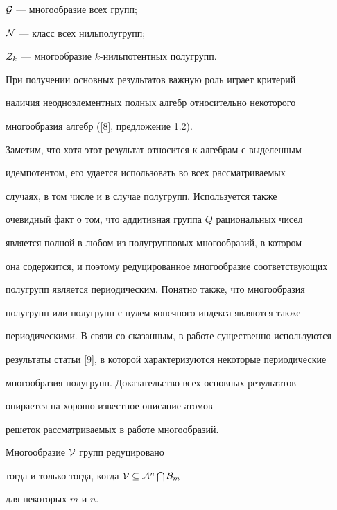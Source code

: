 ${\cal G}$ --- многообразие всех групп;





${\cal N}$ --- класс всех нильполугрупп; 





${\cal Z}_k$ --- многообразие $k$-нильпотентных полугрупп.





При получении основных результатов важную роль играет критерий


наличия неодноэлементных полных алгебр относительно некоторого


многообразия алгебр ([8], предложение 1.2).


Заметим, что хотя этот результат относится к алгебрам с выделенным


идемпотентом, его удается использовать во всех рассматриваемых


случаях, в том числе и в случае полугрупп. Используется также


очевидный факт о том, что аддитивная группа $Q$ рациональных чисел


является полной в любом из полугрупповых многообразий, в котором


она содержится, и поэтому редуцированное многообразие соответствующих


полугрупп является периодическим. Понятно также, что многообразия


полугрупп или полугрупп с нулем конечного индекса являются также


периодическими. В связи со сказанным, в работе существенно используются


результаты статьи [9], в которой характеризуются некоторые периодические


многообразия полугрупп. Доказательство всех основных результатов


опирается на хорошо известное описание атомов


решеток рассматриваемых в работе многообразий.





\begin{thm}


Многообразие ${\cal V}$ групп редуцировано


тогда и только тогда, когда ${\cal V}\subseteq {\cal A}^n \bigcap {\cal B}_m$


для некоторых $m$ и $n$.


\end{thm}





